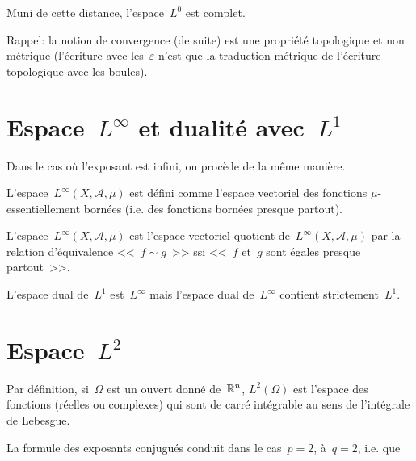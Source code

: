 \begin{theoreme}
Muni de cette distance, l'espace~$L^0$ est complet.
\end{theoreme}

\medskip
Rappel: la notion de convergence (de suite) est une propriété topologique et non
métrique (l'écriture avec les~$\varepsilon$ n'est que la traduction métrique
de l'écriture topologique avec les boules).

\medskip
\section{Espace~$L^\infty$ et dualité avec~$L^1$}
Dans le cas où l'exposant est infini, on procède de la même manière.

\medskip
L'espace~$L^\infty(X, \mathcal{A}, \mu)$ est défini comme l'espace vectoriel des fonctions
$\mu$-essentiellement bornées (i.e. des fonctions bornées presque partout).

L'espace~$L^\infty(X, \mathcal{A}, \mu)$ est l'espace vectoriel quotient de~$L^\infty(X, \mathcal{A}, \mu)$
par la relation d'équivalence <<~$f \sim g$~>> ssi <<~$f$ et~$g$ sont égales presque partout~>>.

\begin{theoreme}
L'espace dual de~$L^1$ est~$L^{\infty}$ mais l'espace dual de~$L^{\infty}$ contient strictement~$L^1$.
\end{theoreme}

\medskip
\section{Espace~$L^2$}

Par définition, si~$\Omega$ est un ouvert donné de~$\mathbb R^n$, $L^2(\Omega)$ est l'espace des
fonctions (réelles ou complexes) qui sont de carré intégrable au sens de l'intégrale de Lebesgue.

\medskip
\begin{theoreme}
\end{theoreme}

\medskip
La formule des exposants conjugués conduit dans le cas~$p=2$, à~$q=2$, i.e.
que 


